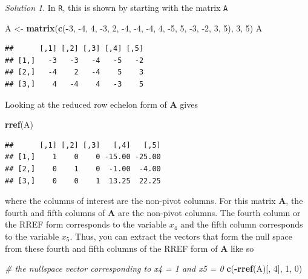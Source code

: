 \documentclass[
]{book}
\newenvironment{Shaded}{\begin{snugshade}}{\end{snugshade}}
\newcommand{\CommentTok}[1]{\textcolor[rgb]{0.56,0.35,0.01}{\textit{#1}}}
\newcommand{\DecValTok}[1]{\textcolor[rgb]{0.00,0.00,0.81}{#1}}
\newcommand{\KeywordTok}[1]{\textcolor[rgb]{0.13,0.29,0.53}{\textbf{#1}}}
\newcommand{\NormalTok}[1]{#1}
\newcommand{\OperatorTok}[1]{\textcolor[rgb]{0.81,0.36,0.00}{\textbf{#1}}}
\newcommand{\StringTok}[1]{\textcolor[rgb]{0.31,0.60,0.02}{#1}}
\theoremstyle{definition}
\theoremstyle{definition}
\theoremstyle{definition}
\theoremstyle{remark}
\newtheorem*{solution}{Solution}
\begin{document}
\begin{solution}
In \texttt{R}, this is shown by starting with the matrix \texttt{A}

\begin{Shaded}
\begin{Highlighting}[]
\NormalTok{A <-}\StringTok{ }\KeywordTok{matrix}\NormalTok{(}\KeywordTok{c}\NormalTok{(}\OperatorTok{-}\DecValTok{3}\NormalTok{, }\DecValTok{-4}\NormalTok{, }\DecValTok{4}\NormalTok{, }\DecValTok{-3}\NormalTok{, }\DecValTok{2}\NormalTok{, }\DecValTok{-4}\NormalTok{, }\DecValTok{-4}\NormalTok{, }\DecValTok{-4}\NormalTok{, }\DecValTok{4}\NormalTok{, }\DecValTok{-5}\NormalTok{, }\DecValTok{5}\NormalTok{, }\DecValTok{-3}\NormalTok{, }\DecValTok{-2}\NormalTok{, }\DecValTok{3}\NormalTok{, }\DecValTok{5}\NormalTok{), }\DecValTok{3}\NormalTok{, }\DecValTok{5}\NormalTok{)}
\NormalTok{A}
\end{Highlighting}
\end{Shaded}

\begin{verbatim}
##      [,1] [,2] [,3] [,4] [,5]
## [1,]   -3   -3   -4   -5   -2
## [2,]   -4    2   -4    5    3
## [3,]    4   -4    4   -3    5
\end{verbatim}

Looking at the reduced row echelon form of \(\mathbf{A}\) gives

\begin{Shaded}
\begin{Highlighting}[]
\KeywordTok{rref}\NormalTok{(A)}
\end{Highlighting}
\end{Shaded}

\begin{verbatim}
##      [,1] [,2] [,3]   [,4]   [,5]
## [1,]    1    0    0 -15.00 -25.00
## [2,]    0    1    0  -1.00  -4.00
## [3,]    0    0    1  13.25  22.25
\end{verbatim}

where the columns of interest are the non-pivot columns. For this matrix \(\mathbf{A}\), the fourth and fifth columns of \(\mathbf{A}\) are the non-pivot columns. The fourth column or the RREF form corresponds to the variable \(x_4\) and the fifth column corresponds to the variable \(x_5\). Thus, you can extract the vectors that form the null space from these fourth and fifth columns of the RREF form of \(\mathbf{A}\) like so

\begin{Shaded}
\begin{Highlighting}[]
\CommentTok{# the nullspace vector corresponding to x4 = 1 and x5 = 0}
\KeywordTok{c}\NormalTok{(}\OperatorTok{-}\KeywordTok{rref}\NormalTok{(A)[, }\DecValTok{4}\NormalTok{], }\DecValTok{1}\NormalTok{, }\DecValTok{0}\NormalTok{)}
\end{Highlighting}
\end{Shaded}


\end{solution}
\end{document}
